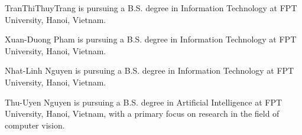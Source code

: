 \documentclass{ieeeaccess}
\begin{document}
\begin{IEEEbiography}{TranThiThuyTrang} is pursuing a B.S. degree in Information Technology at FPT University, Hanoi, Vietnam.
\end{IEEEbiography}

\begin{IEEEbiography}{Xuan-Duong Pham} is pursuing a B.S. degree in Information Technology at FPT University, Hanoi, Vietnam.
\end{IEEEbiography}

\begin{IEEEbiography}{Nhat-Linh Nguyen} is pursuing a B.S. degree in Information Technology at FPT University, Hanoi, Vietnam.
\end{IEEEbiography}

\begin{IEEEbiography}{Thu-Uyen Nguyen} is pursuing a B.S. degree in Artificial Intelligence at FPT University, Hanoi, Vietnam, with a primary focus on research in the field of computer vision.
\end{IEEEbiography}
\end{document}
